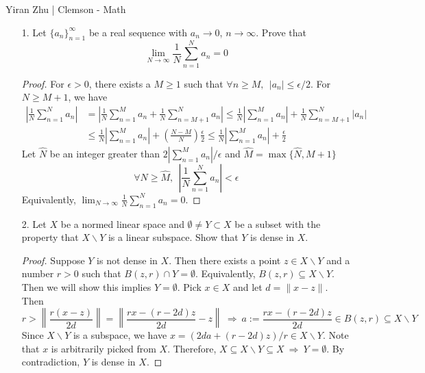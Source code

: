 	\begin{center}
		\normalsize{Yiran Zhu | Clemson - Math}
	\end{center}

\begin{itemize}
	\item[1.] Let $\{a_n\}_{n=1}^\infty$ be a real sequence with $a_n \rightarrow 0$, $n \rightarrow \infty$. Prove that
	$$
	\lim_{N\rightarrow \infty} \frac{1}{N}\sum_{n=1}^Na_n = 0
	$$
 
	\begin{proof}
		For $\epsilon > 0$,  there exists a $M\ge 1$ such that $\forall n\ge M, ~~|a_n| \le \epsilon/2$. For $N\ge M+1$, we have 
		$$
		\begin{aligned}
		 \left\lvert\frac{1}{N}\sum_{n=1}^Na_n\right\rvert &=  \left\lvert\frac{1}{N}\sum_{n=1}^Ma_n + \frac{1}{N} \sum_{n=M+1}^Na_n\right\rvert \le \frac{1}{N}\left\lvert\sum_{n=1}^Ma_n \right\rvert + \frac{1}{N} \sum_{n=M+1}^N\left\lvert a_n\right\rvert  \\
		 &\le \frac{1}{N}\left\lvert\sum_{n=1}^Ma_n \right\rvert + \left(\frac{N-M}{N}\right)\frac{\epsilon}{2}\le \frac{1}{N}\left\lvert\sum_{n=1}^Ma_n \right\rvert + \frac{\epsilon}{2}
		\end{aligned}
		$$
		Let $\widehat{N}$ be an integer greater than $2\left\lvert\sum_{n=1}^Ma_n \right\rvert/\epsilon$ and $\widehat{M} = \max\{\widehat{N}, M+1\}$
		$$
		\forall N \ge \widehat{M}, ~~\left\lvert\frac{1}{N}\sum_{n=1}^Na_n\right\rvert < \epsilon
		$$
		Equivalently, $\lim_{N\rightarrow \infty} \frac{1}{N}\sum_{n=1}^Na_n = 0$.
	\end{proof}

	\item[2.] Let $X$ be a normed linear space and $\emptyset \neq Y\subset X$ be  a subset with the property that
	$X \backslash Y$ is a linear subspace. Show that $Y$ is dense in $X$.

	\begin{proof}
		 Suppose $Y$ is not dense in $X$. Then there exists a point $z\in X\backslash Y$ and a number $r > 0$ such that 
		 $B(z, r) \cap Y=\emptyset$. Equivalently, $B(z,r)\subseteq X\backslash Y$. Then we will show this implies $Y=\emptyset$. Pick $x\in X$ and let $d= \lVert x-z\rVert$. Then
		 $$
		 r>\left\lVert \frac{r(x-z)}{2d}  \right\rVert = \left\lVert \frac{rx- (r-2d)z}{2d} - z \right\rVert ~\Rightarrow~ a:=\frac{rx- (r-2d)z}{2d}\in B(z,r) \subseteq X\backslash Y
		 $$  
		 Since $X\backslash Y$ is a subspace, we have $x = (2da+(r-2d)z)/r \in X\backslash Y$. Note that $x$ is arbitrarily picked from $X$. Therefore, $X\subseteq X\backslash Y \subseteq X ~\Rightarrow~ Y = \emptyset$. By contradiction, $Y$ is dense in $X$.
	\end{proof}
	

\end{itemize}
